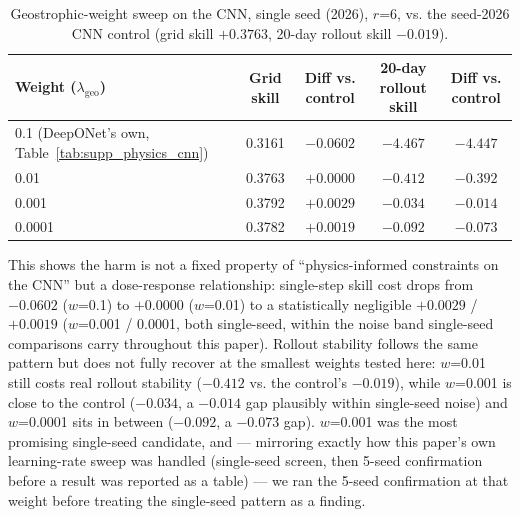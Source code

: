 \documentclass[11pt]{article}
\begin{document}
\begin{table}[h]
\centering
\caption{Geostrophic-weight sweep on the CNN, single seed (2026), $r$=6, vs. the seed-2026 CNN control (grid skill $+0.3763$, 20-day rollout skill $-0.019$).}
\label{tab:supp_physics_weight_sweep}
\begin{tabular}{lcccc}
\toprule
Weight ($\lambda_{\text{geo}}$) & Grid skill & Diff vs. control & 20-day rollout skill & Diff vs. control \\
\midrule
0.1 (DeepONet's own, Table~\ref{tab:supp_physics_cnn}) & 0.3161 & $-0.0602$ & $-4.467$ & $-4.447$ \\
0.01    & 0.3763 & $+0.0000$ & $-0.412$ & $-0.392$ \\
0.001   & 0.3792 & $+0.0029$ & $-0.034$ & $-0.014$ \\
0.0001  & 0.3782 & $+0.0019$ & $-0.092$ & $-0.073$ \\
\bottomrule
\end{tabular}
\end{table}

This shows the harm is not a fixed property of ``physics-informed constraints on the CNN'' but a dose-response relationship: single-step skill cost drops from $-0.0602$ ($w$=0.1) to $+0.0000$ ($w$=0.01) to a statistically negligible $+0.0029$ / $+0.0019$ ($w$=0.001 / 0.0001, both single-seed, within the noise band single-seed comparisons carry throughout this paper). Rollout stability follows the same pattern but does not fully recover at the smallest weights tested here: $w$=0.01 still costs real rollout stability ($-0.412$ vs. the control's $-0.019$), while $w$=0.001 is close to the control ($-0.034$, a $-0.014$ gap plausibly within single-seed noise) and $w$=0.0001 sits in between ($-0.092$, a $-0.073$ gap). $w$=0.001 was the most promising single-seed candidate, and --- mirroring exactly how this paper's own learning-rate sweep was handled (single-seed screen, then 5-seed confirmation before a result was reported as a table) --- we ran the 5-seed confirmation at that weight before treating the single-seed pattern as a finding.
\end{document}

